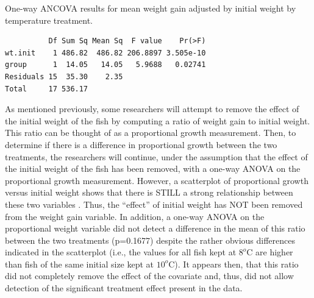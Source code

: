 \documentclass[10pt,openany]{book}\usepackage[]{graphicx}\usepackage[]{color}
\makeatletter
\newenvironment{kframe}{%
 \def\at@end@of@kframe{}%
 \ifinner\ifhmode%
  \def\at@end@of@kframe{\end{minipage}}%
  \begin{minipage}{\columnwidth}%
 \fi\fi%
 \def\FrameCommand##1{\hskip\@totalleftmargin \hskip-\fboxsep
 \colorbox{shadecolor}{##1}\hskip-\fboxsep
     \hskip-\linewidth \hskip-\@totalleftmargin \hskip\columnwidth}%
 \MakeFramed {\advance\hsize-\width
   \@totalleftmargin\z@ \linewidth\hsize
   \@setminipage}}%
 {\par\unskip\endMakeFramed%
 \at@end@of@kframe}
\newenvironment{knitrout}{}{} %
\makeatother
\begin{document}
\begin{table}[h]
  \centering
  \caption{One-way ANCOVA results for mean weight gain adjusted by initial weight by temperature treatment.}\label{tab:IVRANCOVAEx1Res2}
\begin{knitrout}
\color{fgcolor}\begin{kframe}
\begin{verbatim}
          Df Sum Sq Mean Sq  F value    Pr(>F)
wt.init    1 486.82  486.82 206.8897 3.505e-10
group      1  14.05   14.05   5.9688   0.02741
Residuals 15  35.30    2.35                   
Total     17 536.17                           
\end{verbatim}
\end{kframe}
\end{knitrout}
\end{table}


As mentioned previously, some researchers will attempt to remove the effect of the initial weight of the fish by computing a ratio of weight gain to initial weight.  This ratio can be thought of as a proportional growth measurement.  Then, to determine if there is a difference in proportional growth between the two treatments, the researchers will continue, under the assumption that the effect of the initial weight of the fish has been removed, with a one-way ANOVA on the proportional growth measurement.  However, a scatterplot of proportional growth versus initial weight shows that there is STILL a strong relationship between these two variables .  Thus, the ``effect'' of initial weight has NOT been removed from the weight gain variable.  In addition, a one-way ANOVA on the proportional weight variable did not detect a difference in the mean of this ratio between the two treatments (p=0.1677) despite the rather obvious differences indicated in the scatterplot (i.e., the values for all fish kept at $8^{o}$C are higher than fish of the same initial size kept at $10^{o}$C).  It appears then, that this ratio did not completely remove the effect of the covariate and, thus, did not allow detection of the significant treatment effect present in the data.
\end{document}
